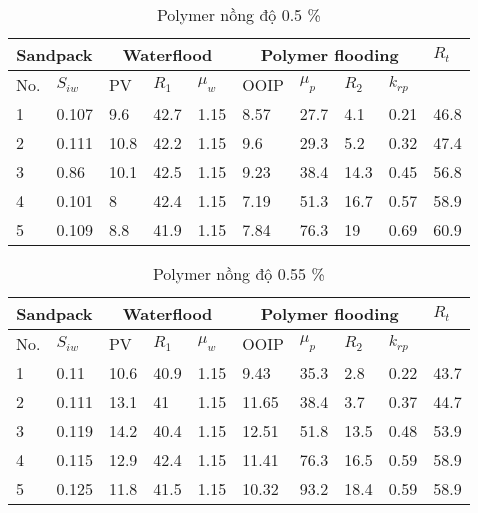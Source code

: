 \documentclass[12pt,a4paper]{article}
\begin{document}
\begin{table}[h]
\centering
\caption{Polymer nồng độ 0.5 \%}
\label{my-label}
\begin{tabularx}{\textwidth}{@{}XX|XXX|XXXX|X@{}}
\toprule
\multicolumn{2}{c}{Sandpack} & \multicolumn{3}{c}{Waterflood} & \multicolumn{4}{c}{Polymer flooding} & $R_t$ \\ \midrule
No.        & $S_{iw}$        & PV      & $R_1$    & $\mu_w$   & OOIP   & $\mu_p$  & $R_2$ & $k_{rp}$ &       \\
1          & 0.107           & 9.6     & 42.7     & 1.15      & 8.57   & 27.7     & 4.1   & 0.21     & 46.8  \\
2          & 0.111           & 10.8    & 42.2     & 1.15      & 9.6    & 29.3     & 5.2   & 0.32     & 47.4  \\
3          & 0.86            & 10.1    & 42.5     & 1.15      & 9.23   & 38.4     & 14.3  & 0.45     & 56.8  \\
4          & 0.101           & 8       & 42.4     & 1.15      & 7.19   & 51.3     & 16.7  & 0.57     & 58.9  \\
5          & 0.109           & 8.8     & 41.9     & 1.15      & 7.84   & 76.3     & 19    & 0.69     & 60.9  \\ \bottomrule
\end{tabularx}
\end{table}
\begin{table}[h]
\centering
\caption{Polymer nồng độ 0.55 \%}
\label{my-label}
\begin{tabularx}{\textwidth}{@{}XX|XXX|XXXX|X@{}}
\toprule
\multicolumn{2}{c}{Sandpack} & \multicolumn{3}{c}{Waterflood} & \multicolumn{4}{c}{Polymer flooding} & $R_t$ \\ \midrule
No.        & $S_{iw}$        & PV      & $R_1$    & $\mu_w$   & OOIP   & $\mu_p$  & $R_2$ & $k_{rp}$ &       \\
1          & 0.11            & 10.6    & 40.9     & 1.15      & 9.43   & 35.3     & 2.8   & 0.22     & 43.7  \\
2          & 0.111           & 13.1    & 41       & 1.15      & 11.65  & 38.4     & 3.7   & 0.37     & 44.7  \\
3          & 0.119           & 14.2    & 40.4     & 1.15      & 12.51  & 51.8     & 13.5  & 0.48     & 53.9  \\
4          & 0.115           & 12.9    & 42.4     & 1.15      & 11.41  & 76.3     & 16.5  & 0.59     & 58.9  \\
5          & 0.125           & 11.8    & 41.5     & 1.15      & 10.32  & 93.2     & 18.4  & 0.59     & 58.9  \\ \bottomrule
\end{tabularx}
\end{table}
\end{document}
